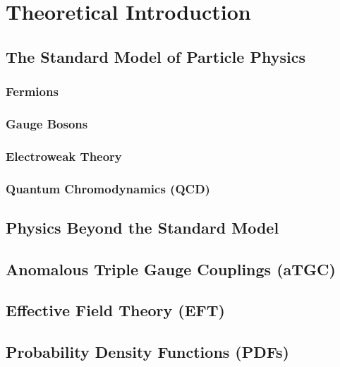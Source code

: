 \chapter{Theoretical Introduction}
\label{chap::TheoreticalIntroduction}

\section{The Standard Model of Particle Physics}
\subsection{Fermions}
\subsection{Gauge Bosons}
\subsection{Electroweak Theory}
\subsection{Quantum Chromodynamics (QCD)}
\section{Physics Beyond the Standard Model}
\section{Anomalous Triple Gauge Couplings (aTGC)}
\section{Effective Field Theory (EFT)}
\section{Probability Density Functions (PDFs)}